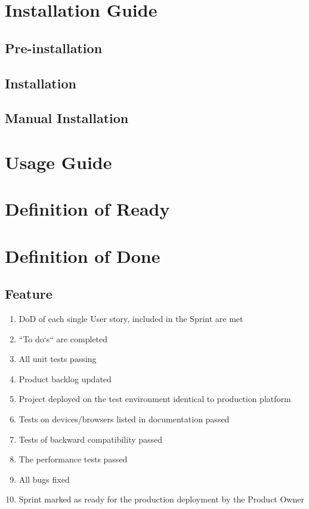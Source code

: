 \documentclass[12pt]{article}
\begin{document}

\tableofcontents
\newpage


\section{Installation Guide}
\lipsum[4]

\subsection{Pre-installation}
\lipsum[2]

\subsection{Installation}
\lipsum[2]

\subsection{Manual Installation}
\lipsum[1]
\newpage

\section{Usage Guide}
\lipsum[1-4]           
\newpage

\section{Definition of Ready}
\newpage

\section{Definition of Done}
\subsection{Feature}
\begin{enumerate}
	\item DoD of each single User story, included in the Sprint are met
	\item ``To do`s`` are completed
	\item All unit tests passing
	\item Product backlog updated
	\item Project deployed on the test environment identical to production platform
	\item Tests on devices/browsers listed in documentation passed
	\item Tests of backward compatibility passed
	\item The performance tests passed
	\item All bugs fixed
	\item Sprint marked as ready for the production deployment by the Product Owner
\end{enumerate}
\end{document}
